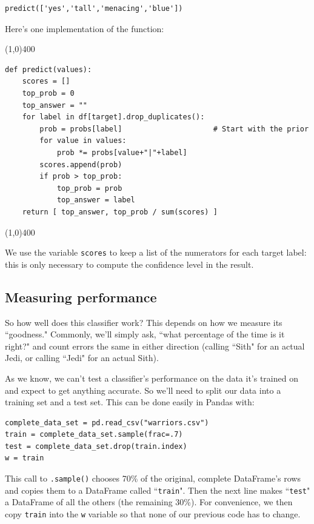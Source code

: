 \documentclass[12pt]{article}
\begin{document}
\begin{Verbatim}[fontsize=\small,samepage=true,frame=none]
predict(['yes','tall','menacing','blue'])
\end{Verbatim}

Here's one implementation of the function:

\begin{center}
\line(1,0){400}
\end{center}
\footnotesize
\begin{Verbatim}[fontsize=\small,samepage=true,frame=none]
def predict(values):
    scores = []
    top_prob = 0
    top_answer = ""
    for label in df[target].drop_duplicates():
        prob = probs[label]                     # Start with the prior
        for value in values:
            prob *= probs[value+"|"+label]
        scores.append(prob)
        if prob > top_prob:
            top_prob = prob
            top_answer = label
    return [ top_answer, top_prob / sum(scores) ]
\end{Verbatim}
\normalsize
\begin{center}
\line(1,0){400}
\end{center}

We use the variable \texttt{scores} to keep a list of the numerators for each
target label: this is only necessary to compute the confidence level in the
result.

\subsection{Measuring performance}

So how well does this classifier work? This depends on how we measure its
``goodness." Commonly, we'll simply ask, ``what percentage of the time is it
right?" and count errors the same in either direction (calling ``Sith" for an
actual Jedi, or calling ``Jedi" for an actual Sith).

As we know, we can't test a classifier's performance on the data it's trained
on and expect to get anything accurate. So we'll need to split our data into a
training set and a test set. This can be done easily in Pandas with:

\begin{Verbatim}[fontsize=\small,samepage=true,frame=none]
complete_data_set = pd.read_csv("warriors.csv")
train = complete_data_set.sample(frac=.7)
test = complete_data_set.drop(train.index)
w = train
\end{Verbatim}

This call to \texttt{.sample()} chooses 70\% of the original, complete
DataFrame's rows and copies them to a DataFrame called ``\texttt{train}". Then
the next line makes ``\texttt{test}" a DataFrame of all the others (the
remaining 30\%). For convenience, we then copy \texttt{train} into the
\texttt{w} variable so that none of our previous code has to change.
\end{document}
